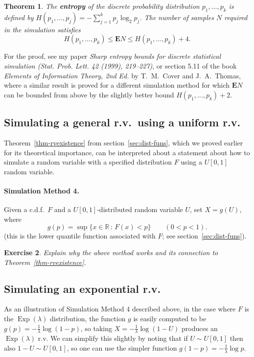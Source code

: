 \documentclass[12pt]{article}
\newtheorem{thm}{Theorem}[section]
\newtheorem{exercise}[thm]{Exercise}
\newcommand{\R}{\mathbb{R}}
\newcommand{\expec}{\mathbf{E}}
\newcommand{\expdist}{\operatorname{Exp}}
\theoremstyle{example}
\begin{document}
\begin{thm}
The \textbf{entropy} of the discrete probability distribution $p_1,\ldots,p_k$ is defined by $H(p_1,\ldots,p_j) = -\sum_{j=1}^k p_j \log_2 p_j$. The number of samples $N$ required in the simulation satisfies
$$ H(p_1,\ldots,p_k) \le \expec N \le H(p_1,\ldots,p_k) + 4. $$
\end{thm}

For the proof, see my paper \textit{Sharp entropy bounds for discrete statistical simulation (Stat. Prob. Lett. 42 (1999), 219--227)}, or section 5.11 of the book \textit{Elements of Information Theory, 2nd Ed.} by T.~M.~Cover and J.~A.~Thomas, where a similar result is proved for a different simulation method for which $\expec N$ can be bounded from above by the slightly better bound $H(p_1,\ldots,p_k)+2$.

%


\subsection{Simulating a general r.v.\ using a uniform r.v.}

Theorem~\ref{thm-rvexistence} from section~\ref{sec:dist-funs}, which we proved earlier for its theoretical importance, can be interpreted about a statement about how to simulate a random variable with a specified distribution $F$ using a $U[0,1]$ random variable.

\paragraph{Simulation Method 4.} Given a c.d.f.\ $F$ and a $U[0,1]$-distributed random variable $U$, set $X=g(U)$, where
$$g(p) = \sup \{ x\in\R\,:\, F(x) < p \} \qquad (0<p<1).$$
(this is the lower quantile function associated with $F$; see section~\ref{sec:dist-funs}).

\begin{exercise} Explain why the above method works and its connection to Theorem~\ref{thm-rvexistence}.
\end{exercise}

\subsection{Simulating an exponential r.v.}

As an illustration of Simulation Method 4 described above, in the case where $F$ is the $\expdist(\lambda)$ distribution, the function $g$ is easily computed to be $g(p)=-\frac{1}{\lambda} \log(1-p)$, so taking $X=-\frac{1}{\lambda} \log (1-U)$ produces an $\expdist(\lambda)$ r.v. We can simplify this slightly by noting that if $U\sim U[0,1]$ then also $1-U \sim U[0,1]$, so one can use the simpler function $g(1-p)=-\frac{1}{\lambda}\log p$.
\end{document}
